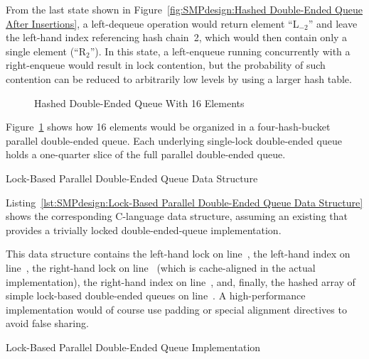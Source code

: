 From the last state shown in
Figure~\ref{fig:SMPdesign:Hashed Double-Ended Queue After Insertions},
a left-dequeue operation would return element ``L$_{-2}$'' and leave
the left-hand index referencing hash chain~2, which would then
contain only a single element (``R$_2$'').
In this state, a left-enqueue running concurrently with a right-enqueue
would result in lock contention, but the probability of such contention
can be reduced to arbitrarily low levels by using a larger hash table.

\begin{figure}[tb]
\centering
{}
\caption{Hashed Double-Ended Queue With 16 Elements}
\label{fig:SMPdesign:Hashed Double-Ended Queue With 16 Elements}
\end{figure}

Figure~\ref{fig:SMPdesign:Hashed Double-Ended Queue With 16 Elements}
shows how 16 elements would be organized in a four-hash-bucket
parallel double-ended queue.
Each underlying single-lock double-ended queue holds a one-quarter
slice of the full parallel double-ended queue.

\begin{listing}[tbp]

\caption{Lock-Based Parallel Double-Ended Queue Data Structure}
\label{lst:SMPdesign:Lock-Based Parallel Double-Ended Queue Data Structure}
\end{listing}

Listing~\ref{lst:SMPdesign:Lock-Based Parallel Double-Ended Queue Data Structure}
shows the corresponding C-language data structure, assuming an
existing  that provides a trivially locked
double-ended-queue implementation.
\begin{fcvref}
This data structure contains the left-hand lock on line~,
the left-hand index on line~, the right-hand lock on line~
(which is cache-aligned in the actual implementation),
the right-hand index on line~, and, finally, the hashed array
of simple lock-based double-ended queues on line~.
A high-performance implementation would of course use padding or special
alignment directives to avoid false sharing.
\end{fcvref}

\begin{listing}[tbp]

\caption{Lock-Based Parallel Double-Ended Queue Implementation}
\label{lst:SMPdesign:Lock-Based Parallel Double-Ended Queue Implementation}
\end{listing}

